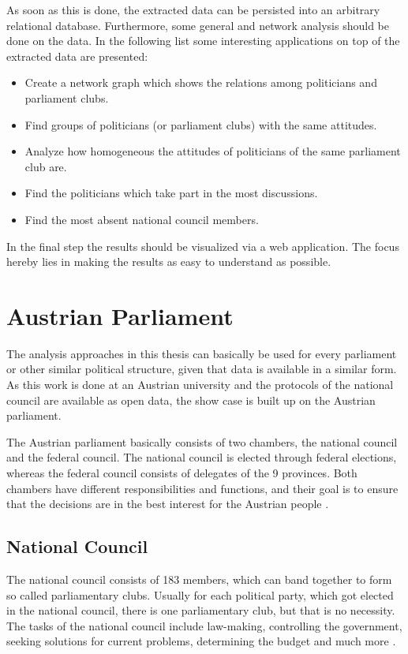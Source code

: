 As soon as this is done, the extracted data can be persisted into an arbitrary relational database. Furthermore, some general and network analysis should be done on the data. In the following list some interesting applications on top of the extracted data are presented:
\begin{itemize}
  \item Create a network graph which shows the relations among politicians and parliament clubs.
  \item Find groups of politicians (or parliament clubs) with the same attitudes.
  \item Analyze how homogeneous the attitudes of politicians of the same parliament club are.
  \item Find the politicians which take part in the most discussions.
  \item Find the most absent national council members.
\end{itemize}

In the final step the results should be visualized via a web application. The focus hereby lies in making the results as easy to understand as possible.

\section{Austrian Parliament}
The analysis approaches in this thesis can basically be used for every parliament or other similar political structure, given that data is available in a similar form. As this work is done at an Austrian university and the protocols of the national council are available as open data, the show case is built up on the Austrian parliament.

The Austrian parliament basically consists of two chambers, the national council and the federal council. The national council is elected through federal elections, whereas the federal council consists of delegates of the 9 provinces. Both chambers have different responsibilities and functions, and their goal is to ensure that the decisions are in the best interest for the Austrian people \cite{AustrianParliament_2015}.

\subsection{National Council}
The national council consists of 183 members, which can band together to form so called parliamentary clubs. Usually for each political party, which got elected in the national council, there is one parliamentary club, but that is no necessity. The tasks of the national council include law-making, controlling the government, seeking solutions for current problems, determining the budget and much more \cite{AustrianParliament_2015}.

